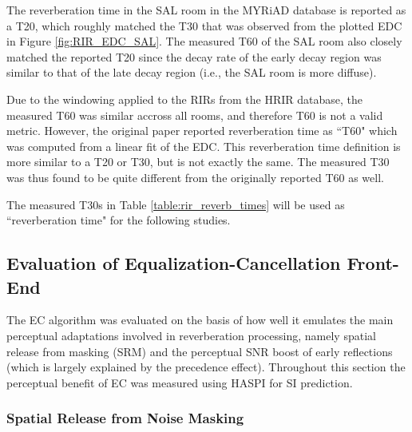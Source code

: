 The reverberation time in the SAL room in the MYRiAD database is reported as a T20, which roughly matched the T30 that was observed from the plotted EDC in Figure \ref{fig:RIR_EDC_SAL}. The measured T60 of the SAL room also closely matched the reported T20 since the decay rate of the early decay region was similar to that of the late decay region (i.e., the SAL room is more diffuse). 

Due to the windowing applied to the RIRs from the HRIR database, the measured T60 was similar accross all rooms, and therefore T60 is not a valid metric. However, the original paper reported reverberation time as ``T60" which was computed from a linear fit of the EDC. This reverberation time definition is more similar to a T20 or T30, but is not exactly the same. The measured T30 was thus found to be quite different from the originally reported T60 as well.

The measured T30s in Table \ref{table:rir_reverb_times} will be used as ``reverberation time" for the following studies.



\subsection{Evaluation of Equalization-Cancellation Front-End}

The EC algorithm was evaluated on the basis of how well it emulates the main perceptual adaptations involved in reverberation processing, namely spatial release from masking (SRM) and the perceptual SNR boost of early reflections (which is largely explained by the precedence effect). Throughout this section the perceptual benefit of EC was measured using HASPI for SI prediction.

\subsubsection{Spatial Release from Noise Masking}

